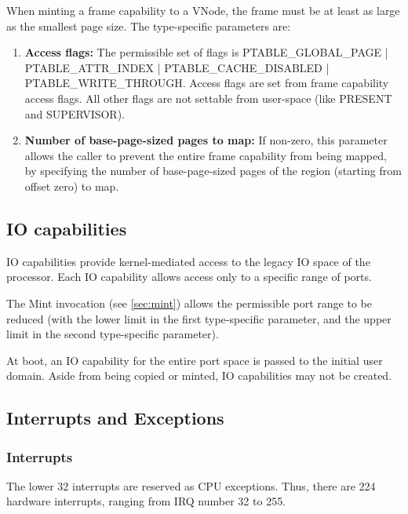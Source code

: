 \documentclass{scrreprt}
\begin{document}
    When minting a frame capability to a
    VNode, the frame must be at least as large as the smallest page size. The
    type-specific parameters are:

    \begin{enumerate}
      \item \textbf{Access flags:}
        The permissible set of flags is PTABLE\_GLOBAL\_PAGE
        | PTABLE\_ATTR\_INDEX | PTABLE\_CACHE\_DISABLED |
        PTABLE\_WRITE\_THROUGH. Access flags are set from frame capability
        access flags. All other flags are not settable from user-space (like
        PRESENT and SUPERVISOR).

      \item \textbf{Number of base-page-sized pages to map:} If non-zero, this
        parameter allows the caller to prevent the entire frame capability from
        being mapped, by specifying the number of base-page-sized pages
        of the region (starting from offset zero) to map.
    \end{enumerate}

    \subsection{IO capabilities}

    IO capabilities provide kernel-mediated access to the legacy IO space of
the processor. Each IO capability allows access only to a specific range of
ports.

    The Mint invocation (see \autoref{sec:mint}) allows the permissible
port range to be reduced (with the lower limit in the first
type-specific parameter, and the upper limit in the second type-specific
parameter).

    At boot, an IO capability for the entire port space is passed to the
initial user domain. Aside from being copied or minted, IO capabilities may not
be created.

  \subsection{Interrupts and Exceptions}

  \subsubsection{Interrupts}

  The lower 32 interrupts are reserved as CPU exceptions. Thus, there
  are 224 hardware interrupts, ranging from IRQ number 32 to 255.
  
\end{document}
